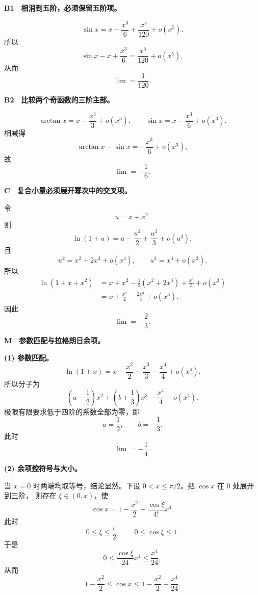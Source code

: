 \begin{solutionBox}
\textbf{B1　相消到五阶，必须保留五阶项。}

\[
\sin x
=x-\frac{x^3}{6}+\frac{x^5}{120}+o(x^5).
\]
所以
\[
\sin x-x+\frac{x^3}{6}
=\frac{x^5}{120}+o(x^5),
\]
从而
\[
\boxed{\lim=\frac1{120}}.
\]
\end{solutionBox}

\begin{solutionBox}
\textbf{B2　比较两个奇函数的三阶主部。}

\[
\arctan x=x-\frac{x^3}{3}+o(x^3),
\qquad
\sin x=x-\frac{x^3}{6}+o(x^3).
\]
相减得
\[
\arctan x-\sin x
=-\frac{x^3}{6}+o(x^3),
\]
故
\[
\boxed{\lim=-\frac16}.
\]
\end{solutionBox}

\begin{solutionBox}
\textbf{C　复合小量必须展开幂次中的交叉项。}

令
\[
u=x+x^2.
\]
则
\[
\ln(1+u)=u-\frac{u^2}{2}+\frac{u^3}{3}+o(u^3),
\]
且
\[
u^2=x^2+2x^3+o(x^3),
\qquad
u^3=x^3+o(x^3).
\]
所以
\[
\begin{aligned}
\ln(1+x+x^2)
&=x+x^2-\frac12(x^2+2x^3)+\frac{x^3}{3}+o(x^3)\\
&=x+\frac{x^2}{2}-\frac{2x^3}{3}+o(x^3).
\end{aligned}
\]
因此
\[
\boxed{\lim=-\frac23}.
\]
\end{solutionBox}

\begin{solutionBox}
\textbf{M　参数匹配与拉格朗日余项。}

\textbf{(1) 参数匹配。}
\[
\ln(1+x)
=x-\frac{x^2}{2}+\frac{x^3}{3}-\frac{x^4}{4}+o(x^4).
\]
所以分子为
\[
\left(a-\frac12\right)x^2
+\left(b+\frac13\right)x^3
-\frac{x^4}{4}+o(x^4).
\]
极限有限要求低于四阶的系数全部为零，即
\[
a=\frac12,\qquad b=-\frac13.
\]
此时
\[
\boxed{\lim=-\frac14}.
\]

\textbf{(2) 余项控符号与大小。}

当 \(x=0\) 时两端均取等号，结论显然。下设
\(0<x\le\pi/2\)。把 \(\cos x\) 在 \(0\) 处展开到三阶，
则存在 \(\xi\in(0,x)\)，使
\[
\cos x
=1-\frac{x^2}{2}+\frac{\cos\xi}{4!}x^4.
\]
此时
\[
0\le\xi\le\frac{\pi}{2},
\qquad 0\le\cos\xi\le1.
\]
于是
\[
0\le\frac{\cos\xi}{24}x^4\le\frac{x^4}{24},
\]
从而
\[
\boxed{
1-\frac{x^2}{2}
\le\cos x
\le1-\frac{x^2}{2}+\frac{x^4}{24}
}.
\]
\end{solutionBox}
